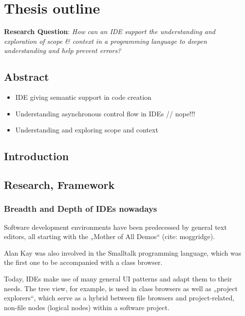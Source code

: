 \chapter{Thesis outline}\label{thesis-outline}

\textbf{Research Question}: \emph{How can an IDE support the
understanding and exploration of scope \& context in a programming
language to deepen understanding and help prevent errors?}

\section{Abstract}\label{abstract}

\begin{itemize}
\itemsep1pt\parskip0pt
\item
  IDE giving semantic support in code creation
\item
  Understanding asynchronous control flow in IDEs // nope!!!
\item
  Understanding and exploring scope and context
\end{itemize}

\section{Introduction}\label{introduction}

\section{Research, Framework}\label{research-framework}

\subsection{Breadth and Depth of IDEs
nowadays}\label{breadth-and-depth-of-ides-nowadays}

Software development environments have been predecessed by general text
editors, all starting with the „Mother of All Demos“ (cite: moggridge).

Alan Kay was also involved in the Smalltalk programming language, which
was the first one to be accompanied with a class browser.

Today, IDEs make use of many general UI patterns and adapt them to their
needs. The tree view, for example, is used in class browsers as well as
„project explorers“, which serve as a hybrid between file browsers and
project-related, non-file nodes (logical nodes) within a software
project.

